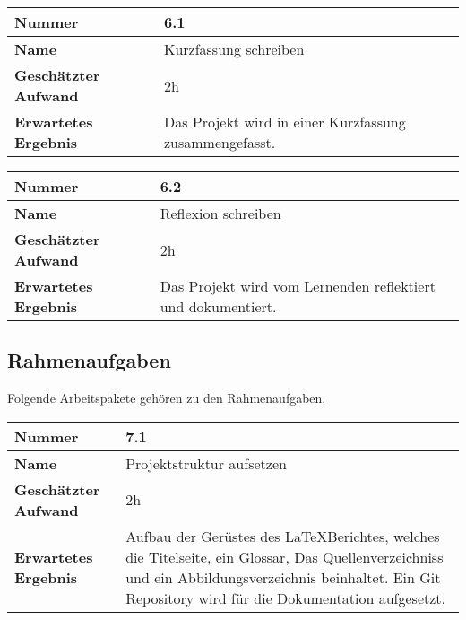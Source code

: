 \begin{longtable}{p{}|p{}}
	\hline
	\textbf{Nummer}                 & \textbf{6.1}            \\
	\hline
	\textbf{Name}   				& Kurzfassung schreiben                  \\
	\hline
	\textbf{Geschätzter Aufwand}    & 2h                                    \\
	\hline
	\textbf{Erwartetes Ergebnis}    & Das Projekt wird in einer Kurzfassung zusammengefasst.                                    \\
	\hline
\end{longtable}\label{tab:auswerten-6.1}

\begin{longtable}{p{}|p{}}
	\hline
	\textbf{Nummer}                 & \textbf{6.2}            \\
	\hline
	\textbf{Name}   				& Reflexion schreiben                  \\
	\hline
	\textbf{Geschätzter Aufwand}    & 2h                                    \\
	\hline
	\textbf{Erwartetes Ergebnis}    & Das Projekt wird vom Lernenden reflektiert und dokumentiert.                                    \\
	\hline
\end{longtable}\label{tab:auswerten-6.2}

\subsection{Rahmenaufgaben}
Folgende Arbeitspakete gehören zu den Rahmenaufgaben.

\begin{longtable}{p{}|p{}}
	\hline
	\textbf{Nummer}                 & \textbf{7.1}            \\
	\hline
	\textbf{Name}   				& Projektstruktur aufsetzen                  \\
	\hline
	\textbf{Geschätzter Aufwand}    & 2h                                    \\
	\hline
	\textbf{Erwartetes Ergebnis}    & Aufbau der Gerüstes des \LaTeX Berichtes, welches die Titelseite, ein Glossar, Das Quellenverzeichniss und ein Abbildungsverzeichnis beinhaltet. Ein Git Repository wird für die Dokumentation aufgesetzt.                                    \\
	\hline
\end{longtable}\label{tab:auswerten-7.1}

